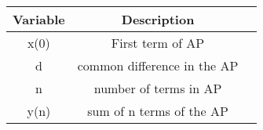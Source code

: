 \begin{tabular}{|c|c|c|}
    \hline
    \textbf{Variable} & \textbf{Description}\\
    \hline
    x(0) & First term of AP\\
    \hline
    d & common difference in the AP\\
    \hline
    n & number of terms in AP\\
    \hline
    y(n) & sum of n terms of the AP\\
    \hline
\end{tabular}
